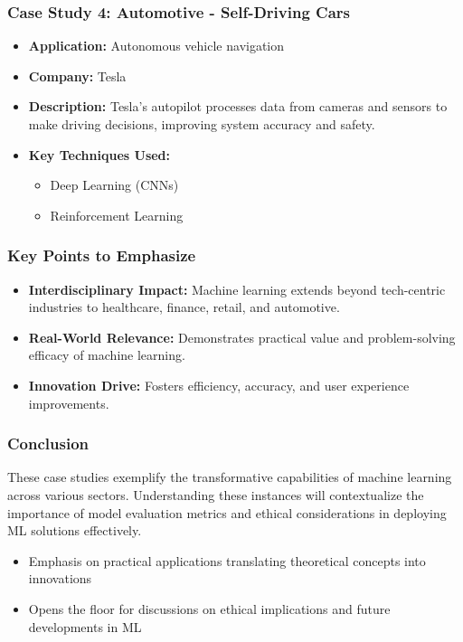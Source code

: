 \documentclass[aspectratio=169]{beamer}
\begin{document}
\begin{frame}[fragile]
    \frametitle{Case Study 4: Automotive - Self-Driving Cars}
    \begin{itemize}
        \item \textbf{Application:} Autonomous vehicle navigation
        \item \textbf{Company:} Tesla
        \item \textbf{Description:} 
        Tesla's autopilot processes data from cameras and sensors to make driving decisions, improving system accuracy and safety.
        \item \textbf{Key Techniques Used:}
            \begin{itemize}
                \item Deep Learning (CNNs)
                \item Reinforcement Learning
            \end{itemize}
    \end{itemize}
\end{frame}

\begin{frame}[fragile]
    \frametitle{Key Points to Emphasize}
    \begin{itemize}
        \item \textbf{Interdisciplinary Impact:} 
        Machine learning extends beyond tech-centric industries to healthcare, finance, retail, and automotive.
        \item \textbf{Real-World Relevance:} 
        Demonstrates practical value and problem-solving efficacy of machine learning.
        \item \textbf{Innovation Drive:} 
        Fosters efficiency, accuracy, and user experience improvements.
    \end{itemize}
\end{frame}

\begin{frame}[fragile]
    \frametitle{Conclusion}
    These case studies exemplify the transformative capabilities of machine learning across various sectors. Understanding these instances will contextualize the importance of model evaluation metrics and ethical considerations in deploying ML solutions effectively.
    \begin{itemize}
        \item Emphasis on practical applications translating theoretical concepts into innovations
        \item Opens the floor for discussions on ethical implications and future developments in ML
    \end{itemize}
\end{frame}
\end{document}
